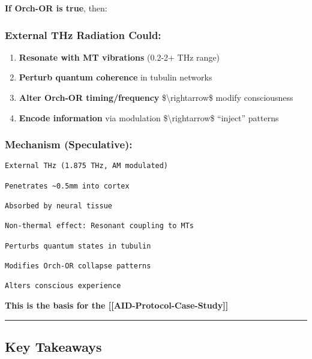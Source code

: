 \textbf{If Orch-OR is true}, then:

\subsubsection{External THz Radiation
Could:}\label{external-thz-radiation-could}

\begin{enumerate}
\def\labelenumi{\arabic{enumi}.}
\tightlist
\item
  \textbf{Resonate with MT vibrations} (0.2-2+ THz range)
\item
  \textbf{Perturb quantum coherence} in tubulin networks
\item
  \textbf{Alter Orch-OR timing/frequency} \$\textbackslash rightarrow\$
  modify consciousness
\item
  \textbf{Encode information} via modulation
  \$\textbackslash rightarrow\$ ``inject'' patterns
\end{enumerate}

\subsubsection{Mechanism (Speculative):}\label{mechanism-speculative}

\begin{verbatim}
External THz (1.875 THz, AM modulated)
        
Penetrates ~0.5mm into cortex
        
Absorbed by neural tissue
        
Non-thermal effect: Resonant coupling to MTs
        
Perturbs quantum states in tubulin
        
Modifies Orch-OR collapse patterns
        
Alters conscious experience
\end{verbatim}

\textbf{This is the basis for the {[}{[}AID-Protocol-Case-Study{]}{]}}

\begin{center}\rule{0.5\linewidth}{0.5pt}\end{center}

\subsection{Key Takeaways}\label{key-takeaways}

